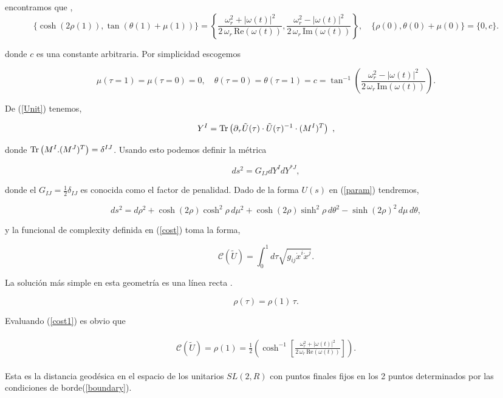 \documentclass[../Main.tex]{subfiles}
\begin{document}
encontramos que \cite{me1},
\begin{equation}
\label{boundary}
\{\cosh(2\rho(1)), \tan(\theta(1)+\mu(1)) \}=\left\{\frac{\omega_r^2+|\omega(t)|^2}{2\,\omega_r\,\text {Re}  (\omega(t))},\frac{\omega_r^2-|\omega(t)|^2}{2\,\omega_r\,\text {Im}  (\omega(t))}\right\},\quad
\{\rho(0), \theta(0)+\mu(0)\}=\{0, c\}.
\end{equation}

donde $c$ es una constante arbitraria. Por simplicidad escogemos

\begin{equation}
\mu(\tau=1)=\mu(\tau=0)=0, \quad\theta(\tau=0)=\theta(\tau=1)=c=\tan^{-1}\left(\frac{\omega_r^2-|\omega(t)|^2}{2\,\omega_r\,\text {Im}  (\omega(t))}\right).
\end{equation}

De (\ref{Unit}) tenemos,

\begin{equation}
Y^{I}=\Tr\left(\partial_{\tau}\tilde U(\tau)\cdot \tilde U(\tau)^{-1}\cdot (M^{I})^{T}\right) \ ,
\end{equation}

donde $\Tr \left(M^{I}. (M^{J})^{T}\right)=\delta^{IJ}$. Usando esto podemos definir la métrica

\begin{equation}
   ds^2= G_{IJ} dY^{I} dY^{* J},
\end{equation}

donde el $G_{IJ}=\frac{1}{2}\delta_{IJ}$ es conocida como el factor de penalidad. Dado de la forma $U(s)$ en (\ref{param}) tendremos,

\begin{equation}
ds^2=d\rho^2+\cosh(2\rho)\cosh^2\rho \,d\mu^2+\cosh(2\rho)\sinh^2\rho\, d\theta^2-\sinh(2\rho)^2\,d\mu\, d\theta,
\end{equation}

y la funcional de complexity definida en (\ref{cost}) toma la forma, 

\begin{equation}
\label{cost1}
\mathcal{C}(\tilde U)=\int_{0}^{1}d\tau \sqrt{g_{ij}\dot x^{i}\dot x^{j}}.
\end{equation}

La solución más simple en esta geometría es una línea recta \citep{Ali_2019}.

\begin{equation}
\rho(\tau)= \rho(1)\, \tau.
\end{equation}

Evaluando (\ref{cost1}) es obvio que 

\begin{align}
\begin{split} \label{answ}
\mathcal{C}(\tilde U)= \rho(1)=\frac{1}{2}\left(\cosh^{-1}\left[\frac{\omega_r^2+|\omega(t)|^2}{2\,\omega_r\,\text {Re}  (\omega(t))}\right]\right) .
\end{split}
\end{align}

Esta es la distancia geodésica en el espacio de los unitarios $SL(2,R)$ con puntos finales fijos en los 2 puntos determinados por las condiciones de borde(\ref{boundary}).


\biblio %
\end{document}
